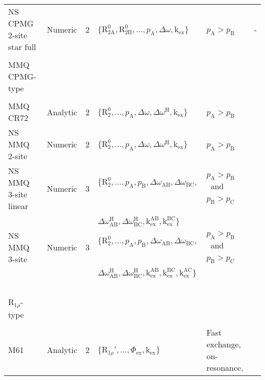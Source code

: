 \documentclass[a4paper,11pt,twoside,openright]{book}
\begin{document}
{\begin{landscape}
\begin{center}
\begin{small}
\begin{longtable}{llllll}
NS CPMG 2-site star full & Numeric  & 2     & $\{\mathrm{R}_{\mathrm{2A}}^0, \mathrm{R}_{\mathrm{2B}}^0, \dots, p_{\textrm{A}}, \Delta\omega , \textrm{k}_{\textrm{ex}}\}$\  & $p_{\textrm{A}}> p_{\textrm{B}}$\                        & - \\
\par
\\
MMQ CPMG-type \\
\cline{1-1}
\\[-5pt]
MMQ CR72                 & Analytic & 2     & $\{\mathrm{R}_2^0, \dots, p_{\textrm{A}}, \Delta\omega , \Delta\omega^{\scriptscriptstyle\mathrm{H}}, \textrm{k}_{\textrm{ex}}\}$\         & $p_{\textrm{A}}> p_{\textrm{B}}$\                        & \citet{Korzhnev04a} \\
NS MMQ 2-site            & Numeric  & 2     & $\{\mathrm{R}_2^0, \dots, p_{\textrm{A}}, \Delta\omega , \Delta\omega^{\scriptscriptstyle\mathrm{H}}, \textrm{k}_{\textrm{ex}}\}$\         & $p_{\textrm{A}}> p_{\textrm{B}}$\                        & \citet{Korzhnev05b} \\
NS MMQ 3-site linear     & Numeric  & 3     & $\{\mathrm{R}_2^0, \dots, p_{\textrm{A}}, p_{\textrm{B}}, \Delta\omega_{\textrm{AB}}, \Delta\omega_{\textrm{BC}},$\        & $p_{\textrm{A}}> p_{\textrm{B}}$\  and $p_{\textrm{B}}> p_{\textrm{C}}$\        & \citet{Korzhnev05b} \\
                         &          &       & $\Delta\omega^{\scriptscriptstyle\mathrm{H}}_{\textrm{AB}}, \Delta\omega^{\scriptscriptstyle\mathrm{H}}_{\textrm{BC}}, \textrm{k}_{\textrm{ex}}^{\textrm{AB}}, \textrm{k}_{\textrm{ex}}^{\textrm{BC}}\}$\  \\
NS MMQ 3-site            & Numeric  & 3     & $\{\mathrm{R}_2^0, \dots, p_{\textrm{A}}, p_{\textrm{B}}, \Delta\omega_{\textrm{AB}}, \Delta\omega_{\textrm{BC}},$\        & $p_{\textrm{A}}> p_{\textrm{B}}$\  and $p_{\textrm{B}}> p_{\textrm{C}}$\        & \citet{Korzhnev05b} \\
                         &          &       & $\Delta\omega^{\scriptscriptstyle\mathrm{H}}_{\textrm{AB}}, \Delta\omega^{\scriptscriptstyle\mathrm{H}}_{\textrm{BC}}, \textrm{k}_{\textrm{ex}}^{\textrm{AB}}, \textrm{k}_{\textrm{ex}}^{\textrm{BC}}, \textrm{k}_{\textrm{ex}}^{\textrm{AC}}\}$\  \\
\par
\\[-5pt]
$\mathrm{R}_{1\rho}$-type \\
\cline{1-1}
\\[-5pt]
M61                      & Analytic & 2     & $\{\mathrm{R}_{1\rho}', \dots, \Phi_{\textrm{ex}}, \textrm{k}_{\textrm{ex}}\}$\             & Fast exchange, on-resonance,      & \citet{Meiboom61} \\

\end{longtable}
\end{small}
\end{center}
\end{landscape}}
\end{document}
